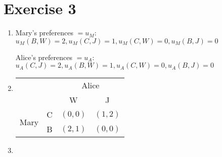 \documentclass[]{article}
\begin{document}
\section*{Exercise 3}
\begin{enumerate}
	\item
	Mary's preferences $=u_M$: \\
	$u_M(B,W)=2, u_M(C,J)=1, u_M(C,W)=0, u_M(B,J)=0$\par
	Alice's preferences $=u_A$:\\
	$u_A(C,J)=2, u_A(B,W)=1, u_A(C,W)=0, u_A(B,J)=0$
	\item
	\begin{tabular}[t]{c c | c c}
		 \multicolumn{2}{c}{}& \multicolumn{2}{c}{Alice} \\
		& & W & J \\
		\cline{2-4}
		\multirow{2}{4ex}{Mary} & C & $(0,0)$ & $(1,2)$\\
		& B & $(2,1)$ & $(0,0)$
	\end{tabular}
	\item
\end{enumerate}
\end{document}

